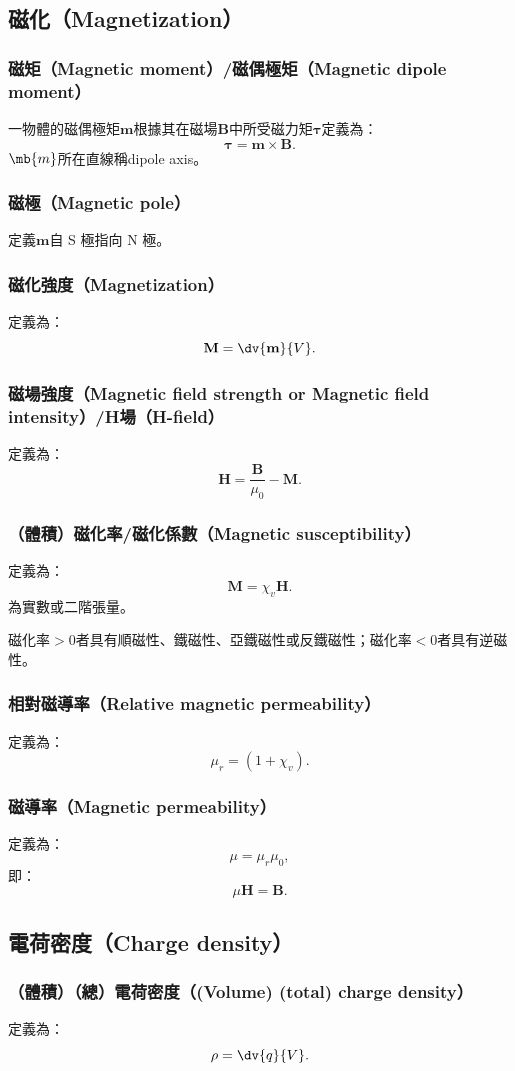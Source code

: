 \documentclass[a4paper,12pt]{report}
\begin{document}
\begin{itemize}
\subsection{磁化（Magnetization）}
\subsubsection{磁矩（Magnetic moment）/磁偶極矩（Magnetic dipole moment）}
一物體的磁偶極矩$\mathbf{m}$根據其在磁場$\mathbf{B}$中所受磁力矩$\boldsymbol{\tau}$定義為：
\[\boldsymbol{\tau} = \mathbf{m} \times \mathbf{B}.\]
$\mb{m}$所在直線稱dipole axis。
\subsubsection{磁極（Magnetic pole）}
定義$\mathbf{m}$自 S 極指向 N 極。
\subsubsection{磁化強度（Magnetization）}
定義為：
\[\mathbf{M} = \dv{\mathbf{m}}{V}.\]
\subsubsection{磁場強度（Magnetic field strength or Magnetic field intensity）/H場（H-field）}
定義為：
\[\mathbf{H} = \frac{\mathbf{B}}{\mu_0} - \mathbf{M}.\]
\subsubsection{（體積）磁化率/磁化係數（Magnetic susceptibility）}
定義為：
\[\mathbf{M}=\chi_v\mathbf{H}.\]
為實數或二階張量。

磁化率$>0$者具有順磁性、鐵磁性、亞鐵磁性或反鐵磁性；磁化率$<0$者具有逆磁性。
\subsubsection{相對磁導率（Relative magnetic permeability）}
定義為：
\[\mu_r=(1+\chi_v).\]
\subsubsection{磁導率（Magnetic permeability）}
定義為：
\[\mu=\mu_r\mu_0,\]
即：
\[\mu\mathbf{H}=\mathbf{B}.\]
\subsection{電荷密度（Charge density）}
\subsubsection{（體積）（總）電荷密度（(Volume) (total) charge density）}
定義為：
\[\rho = \dv{q}{V}.\]

\end{itemize}
\end{document}
